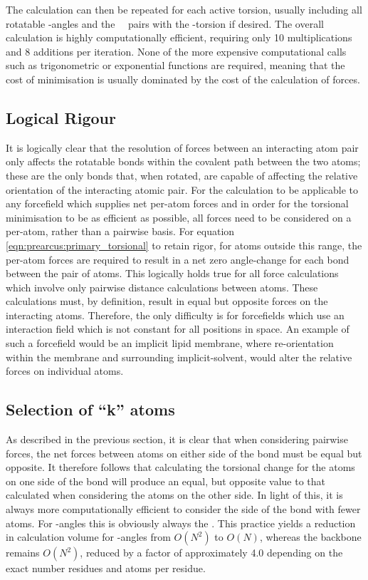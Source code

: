 The calculation can then be repeated for each active torsion, usually including all rotatable \Chi-angles and the \mainchain\ \phipsi\ pairs with the \Omg-torsion if desired.
The overall calculation is highly computationally efficient, requiring only 10 multiplications and 8 additions per iteration. None of the more expensive computational calls such as trigonometric or exponential functions are required, meaning that the cost of minimisation is usually dominated by the cost of the calculation of forces.

\subsection{Logical Rigour}

It is logically clear that the resolution of forces between an interacting atom pair only affects the rotatable bonds within the covalent path between the two atoms; these are the only bonds that, when rotated, are capable of affecting the relative orientation of the interacting atomic pair. For the calculation to be applicable to any forcefield which supplies net per-atom forces and in order for the torsional minimisation to be as efficient as possible, all forces need to be considered on a per-atom, rather than a pairwise basis. For equation \ref{eqn:prearcus:primary_torsional} to retain rigor, for atoms outside this range, the per-atom forces are required to result in a net zero angle-change for each bond between the pair of atoms. This logically holds true for all force calculations which involve only pairwise distance calculations between atoms\cite{THESIS:BREWER}. These calculations  must, by definition, result in equal but opposite forces on the interacting atoms.
Therefore, the only difficulty is for forcefields which use an interaction field which is not constant for all positions in space. An example of such a forcefield would be an implicit lipid membrane, where re-orientation within the membrane and surrounding implicit-solvent, would alter the relative forces on individual atoms.

\subsection{Selection of ``k'' atoms}

As described in the previous section, it is clear that when considering pairwise forces, the net forces between atoms on either side of the bond must be equal but opposite. It therefore follows that calculating the torsional change for the atoms on one side of the bond will produce an equal, but opposite value to that calculated when considering the atoms on the other side. In light of this, it is always more computationally efficient to consider the side of the bond with fewer atoms. For \Chi-angles this is obviously always the \sidechain. This practice yields a reduction in calculation volume for \Chi-angles from $O(N^2)$ to $O(N)$, whereas the backbone remains $O(N^2)$, reduced by a factor of approximately 4.0 depending on the exact number residues  and atoms per residue.\ 

